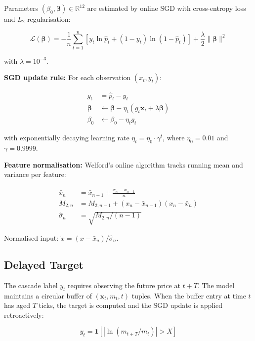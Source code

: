 \documentclass[11pt,a4paper]{article}
\begin{document}
Parameters $(\beta_0, \boldsymbol{\beta}) \in \mathbb{R}^{12}$ are estimated by online SGD with cross-entropy loss and $L_2$ regularisation:

\begin{equation}
\mathcal{L}(\boldsymbol{\beta}) = -\frac{1}{n}\sum_{t=1}^{n}\left[y_t \ln \hat{p}_t + (1-y_t)\ln(1-\hat{p}_t)\right] + \frac{\lambda}{2}\|\boldsymbol{\beta}\|^2
\end{equation}

with $\lambda = 10^{-3}$.

\textbf{SGD update rule:} For each observation $(x_t, y_t)$:

\begin{align}
g_t &= \hat{p}_t - y_t \\
\boldsymbol{\beta} &\leftarrow \boldsymbol{\beta} - \eta_t (g_t \mathbf{x}_t + \lambda \boldsymbol{\beta}) \\
\beta_0 &\leftarrow \beta_0 - \eta_t g_t
\end{align}

with exponentially decaying learning rate $\eta_t = \eta_0 \cdot \gamma^t$, where $\eta_0 = 0.01$ and $\gamma = 0.9999$.

\textbf{Feature normalisation:} Welford's online algorithm tracks running mean and variance per feature:

\begin{align}
\bar{x}_n &= \bar{x}_{n-1} + \frac{x_n - \bar{x}_{n-1}}{n} \\
M_{2,n} &= M_{2,n-1} + (x_n - \bar{x}_{n-1})(x_n - \bar{x}_n) \\
\hat{\sigma}_n &= \sqrt{M_{2,n} / (n-1)}
\end{align}

Normalised input: $\tilde{x} = (x - \bar{x}_n) / \hat{\sigma}_n$.

\subsection{Delayed Target}

The cascade label $y_t$ requires observing the future price at $t + T$. The model maintains a circular buffer of $(\mathbf{x}_t, m_t, t)$ tuples. When the buffer entry at time $t$ has aged $T$ ticks, the target is computed and the SGD update is applied retroactively:

\begin{equation}
y_t = \mathbf{1}\!\left[|\ln(m_{t+T} / m_t)| > X\right]
\end{equation}
\end{document}

